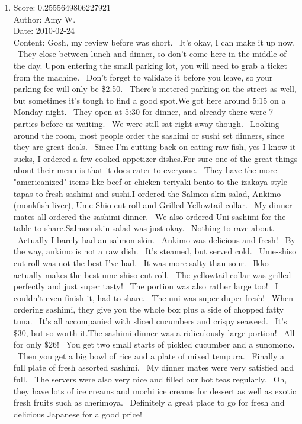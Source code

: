 \documentclass[paper=a4, fontsize=11pt]{jhwhw} %
\begin{document}
\begin{itemize}
\begin{enumerate}
            \item Score: 0.2555649806227921\\
                Author: Amy W.\\
                Date: 2010-02-24\\
                Content: Gosh, my review before was short.  It's okay, I can make it up now.  They close between lunch and dinner, so don't come here in the middle of the day. Upon entering the small parking lot, you will need to grab a ticket from the machine.  Don't forget to validate it before you leave, so your parking fee will only be \$2.50.  There's metered parking on the street as well, but sometimes it's tough to find a good spot.We got here around 5:15 on a Monday night.  They open at 5:30 for dinner, and already there were 7 parties before us waiting.  We were still sat right away though.  Looking around the room, most people order the sashimi or sushi set dinners, since they are great deals.  Since I'm cutting back on eating raw fish, yes I know it sucks, I ordered a few cooked appetizer dishes.For sure one of the great things about their menu is that it does cater to everyone.  They have the more "americanized" items like beef or chicken teriyaki bento to the izakaya style tapas to fresh sashimi and sushi.I ordered the Salmon skin salad, Ankimo (monkfish liver), Ume-Shio cut roll and Grilled Yellowtail collar.  My dinner-mates all ordered the sashimi dinner.  We also ordered Uni sashimi for the table to share.Salmon skin salad was just okay.  Nothing to rave about.  Actually I barely had an salmon skin.  Ankimo was delicious and fresh!  By the way, ankimo is not a raw dish.  It's steamed, but served cold.  Ume-shiso cut roll was not the best I've had.  It was more salty than sour.  Ikko actually makes the best ume-shiso cut roll.  The yellowtail collar was grilled perfectly and just super tasty!  The portion was also rather large too!  I couldn't even finish it, had to share.  The uni was super duper fresh!  When ordering sashimi, they give you the whole box plus a side of chopped fatty tuna.  It's all accompanied with sliced cucumbers and crispy seaweed.  It's \$30, but so worth it.The sashimi dinner was a ridiculously large portion!  All for only \$26!  You get two small starts of pickled cucumber and a sunomono.  Then you get a big bowl of rice and a plate of mixed tempura.  Finally a full plate of fresh assorted sashimi.  My dinner mates were very satisfied and full.  The servers were also very nice and filled our hot teas regularly.  Oh, they have lots of ice creams and mochi ice creams for dessert as well as exotic fresh fruits such as cherimoya.  Definitely a great place to go for fresh and delicious Japanese for a good price!

\end{enumerate}
\end{itemize}
\end{document}
